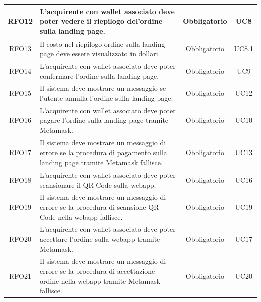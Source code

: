 \documentclass[a4paper, 12pt]{article}
\begin{document}
\begin{longtable}{|c|p{5cm}|c|c|}
\hline
RFO12 & L'acquirente con wallet associato deve poter vedere il riepilogo del'ordine sulla landing page. & Obbligatorio & UC8 \\
\hline
RFO13 & Il costo nel riepilogo ordine sulla landing page deve essere visualizzato in dollari. & Obbligatorio & UC8.1 \\
\hline
RFO14 & L'acquirente con wallet associato deve poter confermare l'ordine sulla landing page. & Obbligatorio & UC9 \\
\hline
RFO15 & Il sistema deve mostrare un messaggio se l'utente annulla l'ordine sulla landing page. & Obbligatorio & UC12 \\
\hline
RFO16 & L'acquirente con wallet associato deve poter pagare l'ordine sulla landing page tramite Metamask. & Obbligatorio & UC10 \\
\hline
RFO17 & Il sistema deve mostrare un messaggio di errore se la procedura di pagamento sulla landing page tramite Metamask fallisce. & Obbligatorio & UC13 \\
\hline
RFO18 & L'acquirente con wallet associato deve poter scansionare il QR Code sulla webapp. & Obbligatorio & UC16 \\
\hline
RFO19 & Il sistema deve mostrare un messaggio di errore se la procedura di scansione QR Code nella webapp fallisce. & Obbligatorio & UC19 \\
\hline
RFO20 & L'acquirente con wallet associato deve poter accettare l'ordine sulla webapp tramite Metamask. & Obbligatorio & UC17 \\
\hline
RFO21 & Il sistema deve mostrare un messaggio di errore se la procedura di accettazione ordine nella webapp tramite Metamask fallisce. & Obbligatorio & UC20 \\
\hline

\end{longtable}
\pagebreak
\end{document}
